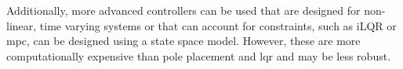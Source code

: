 Additionally, more advanced controllers can be used that are designed for non-linear, time varying systems or that can account for constraints, such as iLQR or \gls{mpc}, can be designed using a state space model.
However, these are more computationally expensive than pole placement and \gls{lqr} and may be less robust.